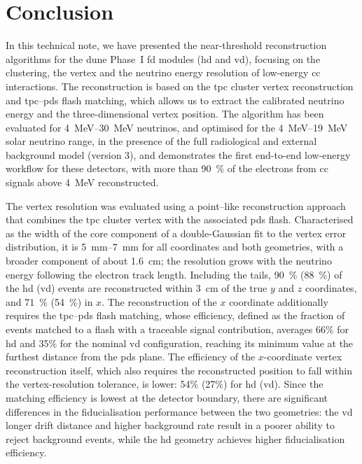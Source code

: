 \section{Conclusion}\label{sec:CONCLUSION}
In this technical note, we have presented the near-threshold reconstruction algorithms for the \gls{dune} Phase~I \gls{fd} modules (\gls{hd} and \gls{vd}), focusing on the clustering, the vertex and the neutrino energy resolution of low-energy \gls{cc} interactions. The reconstruction is based on the \gls{tpc} cluster vertex reconstruction and \gls{tpc}--\gls{pds} flash matching, which allows us to extract the calibrated neutrino energy and the three-dimensional vertex position. The algorithm has been evaluated for \qtyrange{4}{30}{\mega\electronvolt} neutrinos, and optimised for the \qtyrange{4}{19}{\mega\electronvolt} solar neutrino range, in the presence of the full radiological and external background model (version 3), and demonstrates the first end-to-end low-energy workflow for these detectors, with more than \SI{90}{\percent} of the electrons from \gls{cc} signals above \SI{4}{\mega\electronvolt} reconstructed.

The vertex resolution was evaluated using a point--like reconstruction approach that combines the \gls{tpc} cluster vertex with the associated \gls{pds} flash. Characterised as the width of the core component of a double-Gaussian fit to the vertex error distribution, it is \SIrange{5}{7}{\milli\meter} for all coordinates and both geometries, with a broader component of about \SI{1.6}{\centi\meter}; the resolution grows with the neutrino energy following the electron track length. Including the tails, \SI{90}{\percent} (\SI{88}{\percent}) of the \gls{hd} (\gls{vd}) events are reconstructed within \SI{3}{\centi\meter} of the true $y$ and $z$ coordinates, and \SI{71}{\percent} (\SI{54}{\percent}) in $x$. The reconstruction of the $x$ coordinate additionally requires the \gls{tpc}--\gls{pds} flash matching, whose efficiency, defined as the fraction of events matched to a flash with a traceable signal contribution, averages \num{66}\% for \gls{hd} and \num{35}\% for the nominal \gls{vd} configuration, reaching its minimum value at the furthest distance from the \gls{pds} plane. The efficiency of the $x$-coordinate vertex reconstruction itself, which also requires the reconstructed position to fall within the vertex-resolution tolerance, is lower: \num{54}\% (\num{27}\%) for \gls{hd} (\gls{vd}). Since the matching efficiency is lowest at the detector boundary, there are significant differences in the fiducialisation performance between the two geometries: the \gls{vd} longer drift distance and higher background rate result in a poorer ability to reject background events, while the \gls{hd} geometry achieves higher fiducialisation efficiency.

